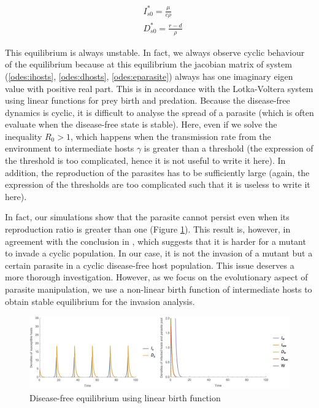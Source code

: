 \documentclass{article}
\begin{document}
\begin{align*}
& I_{s0}^* = \frac{\mu}{c \rho} \\
& D_{s0}^* = \frac{r - d}{\rho}
\end{align*}

This equilibrium is always unstable. In fact, we always observe cyclic behaviour of the equilibrium because at this equilibrium the jacobian matrix of system (\ref{odes:ihosts}, \ref{odes:dhosts}, \ref{odes:eparasite}) always has one imaginary eigen value with positive real part. This is in accordance with the Lotka-Voltera system using linear functions for prey birth and predation. Because the disease-free dynamics is cyclic, it is difficult to analyse the spread of a parasite (which is often evaluate when the disease-free state is stable). Here, even if we solve the inequality $R_0 > 1$, which happens when the transmission rate from the environment to intermediate hosts $\gamma$ is greater than a threshold (the expression of the threshold is too complicated, hence it is not useful to write it here). In addition, the reproduction of the parasites has to be sufficiently large (again, the expression of the thresholds are too complicated such that it is useless to write it here).

In fact, our simulations show that the parasite cannot persist even when its reproduction ratio is greater than one (Figure \ref{fig:diseasefree:linear}). This result is, however, in agreement with the conclusion in \citet{Ripa:Evol:2013}, which suggests that it is harder for a mutant to invade a cyclic population. In our case, it is not the invasion of a mutant but a certain parasite in a cyclic disease-free host population. This issue deserves a more thorough investigation. However, as we focus on the evolutionary aspect of parasite manipulation, we use a non-linear birth function of intermediate hosts to obtain stable equilibrium for the invasion analysis.

\begin{figure}
\includegraphics[width=\textwidth]{Figures/diseasefree_linear}
\caption{Disease-free equilibrium using linear birth function}
\label{fig:diseasefree:linear}
\end{figure}
\end{document}
